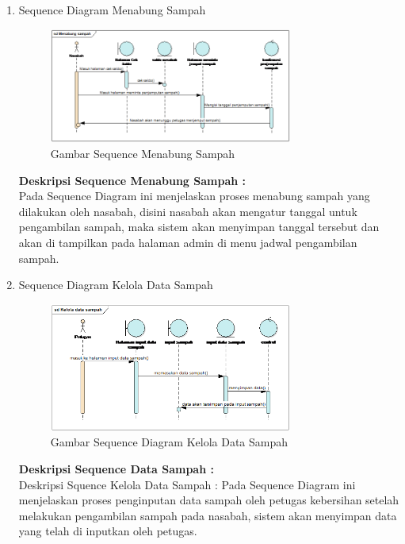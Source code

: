 \begin{enumerate}
\item Sequence Diagram Menabung Sampah
\hfill\\
	\begin{figure}[H]
		\includegraphics[width=8cm]{figures/analisis/8.png}
		\centering
		\caption{Gambar Sequence Menabung Sampah}
	\end{figure}
\textbf{Deskripsi Sequence Menabung Sampah :}
\hfill\\
Pada Sequence Diagram ini menjelaskan proses menabung sampah yang dilakukan oleh nasabah, disini nasabah akan mengatur tanggal untuk pengambilan sampah, maka sistem akan menyimpan tanggal tersebut dan akan di tampilkan pada halaman admin di menu jadwal pengambilan sampah. 

\item Sequence Diagram Kelola Data Sampah
\hfill\\
	\begin{figure}[H]
		\includegraphics[width=8cm]{figures/analisis/9.png}
		\centering
		\caption{Gambar Sequence Diagram Kelola Data Sampah}
	\end{figure}
\textbf{Deskripsi Sequence Data Sampah :}
\hfill\\
Deskripsi Squence Kelola Data Sampah :
Pada Sequence Diagram ini menjelaskan proses penginputan data sampah oleh petugas kebersihan setelah melakukan pengambilan sampah pada nasabah, sistem akan menyimpan data yang telah di inputkan oleh petugas. 


\end{enumerate}

